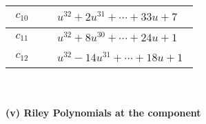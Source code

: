 \documentclass[1p]{elsarticle_modified}
\theoremstyle{definition}
\begin{document}
\begin{tabular}{m{50pt}|m{274pt}}
\hline $$\begin{aligned}c_{10}\end{aligned}$$&$\begin{aligned}
&u^{32}+2 u^{31}+\cdots+33 u+7
\end{aligned}$\\
\hline $$\begin{aligned}c_{11}\end{aligned}$$&$\begin{aligned}
&u^{32}+8 u^{30}+\cdots+24 u+1
\end{aligned}$\\
\hline $$\begin{aligned}c_{12}\end{aligned}$$&$\begin{aligned}
&u^{32}-14 u^{31}+\cdots+18 u+1
\end{aligned}$\\
\hline
\end{tabular}\\~\\
\newpage\renewcommand{\arraystretch}{1}
\flushleft \textbf{(v) Riley Polynomials at the component}\newline \\
\end{document}
